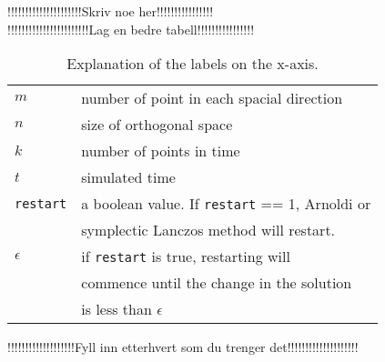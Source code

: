 !!!!!!!!!!!!!!!!!!!!!Skriv noe her!!!!!!!!!!!!!!!!\\
!!!!!!!!!!!!!!!!!!!!!!!Lag en bedre tabell!!!!!!!!!!!!!!!!\\

\begin{table}[h]
\centering
\begin{tabular}{l l}
$m$ & number of point in each spacial direction \\
$n$ & size of orthogonal space \\
$k$ & number of points in time \\
$t$ & simulated time \\
\texttt{restart}& a boolean value. If \texttt{restart} == 1, Arnoldi or \\&symplectic Lanczos method will restart. \\
$\epsilon$ & if \texttt{restart} is true, restarting will\\& commence until the change in the solution\\& is less than $\epsilon$ \\
\end{tabular}
\caption{ Explanation of the labels on the x-axis. }
\label{tab:xlabels}
\end{table}

!!!!!!!!!!!!!!!!!!!Fyll inn etterhvert som du trenger det!!!!!!!!!!!!!!!!!!!!\\